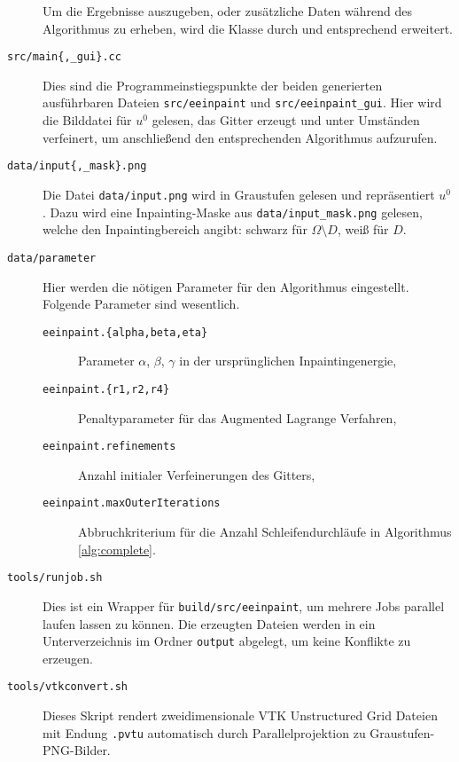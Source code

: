 \documentclass{mythesis}
\begin{document}
\begin{description}
	Um die Ergebnisse auszugeben, oder zusätzliche Daten während des Algorithmus zu erheben, wird die Klasse durch  und  entsprechend erweitert.
    \item[\texttt{src/main\{,_gui\}.cc}]
	Dies sind die Programmeinstiegspunkte der beiden generierten ausführbaren Dateien \texttt{src/eeinpaint} und \texttt{src/eeinpaint_gui}.
	Hier wird die Bilddatei für $u^0$ gelesen, das Gitter erzeugt und unter Umständen verfeinert, um anschließend den entsprechenden Algorithmus aufzurufen.
   \item[\texttt{data/input\{,_mask\}.png}]
	Die Datei \texttt{data/input.png} wird in Graustufen gelesen und repräsentiert $u^0$.
	Dazu wird eine Inpainting-Maske aus \texttt{data/input_mask.png} gelesen, welche den Inpaintingbereich angibt: schwarz für $\Omega \setminus D$, weiß für $D$.
    \item[\texttt{data/parameter}]
	Hier werden die nötigen Parameter für den Algorithmus eingestellt.
	Folgende Parameter sind wesentlich.
	\begin{description}
	    \item[\texttt{eeinpaint.\{alpha,beta,eta\}}]
		Parameter $\alpha$, $\beta$, $\gamma$ in der ursprünglichen Inpaintingenergie,
	    \item[\texttt{eeinpaint.\{r1,r2,r4\}}]
		Penaltyparameter für das Augmented Lagrange Verfahren,
	    \item[\texttt{eeinpaint.refinements}]
		Anzahl initialer Verfeinerungen des Gitters,
	    \item[\texttt{eeinpaint.maxOuterIterations}]
		Abbruchkriterium für die Anzahl Schleifendurchläufe in Algorithmus \ref{alg:complete}.
	\end{description}
    \item[\texttt{tools/runjob.sh}]
	Dies ist ein Wrapper für \texttt{build/src/eeinpaint}, um mehrere Jobs parallel laufen lassen zu können.
	Die erzeugten Dateien werden in ein Unterverzeichnis im Ordner \texttt{output} abgelegt, um keine Konflikte zu erzeugen.
    \item[\texttt{tools/vtkconvert.sh}]
	Dieses Skript rendert zweidimensionale VTK Unstructured Grid Dateien mit Endung \texttt{.pvtu} automatisch durch Parallelprojektion zu Graustufen-PNG-Bilder.
\end{description}
\end{document}
